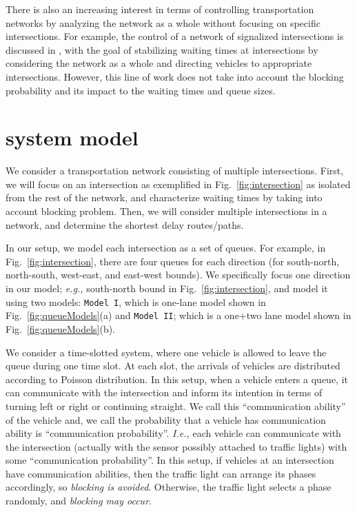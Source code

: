 \documentclass[conference]{IEEEtran}
\newcommand{\Ie}{{\em I.e., }}
\newcommand{\eg}{{\em e.g., }}
\newcommand{\modelI}{{\tt{Model I}}}
\newcommand{\modelII}{{\tt{Model II}}}
\begin{document}
There is also an increasing interest in terms of controlling transportation networks by analyzing the network as a whole without focusing on specific intersections. For example, the control of a network of signalized intersections is discussed in \cite{gregoire}, with the goal of stabilizing waiting times at intersections by considering the network as a whole and directing vehicles to appropriate intersections. However, this line of work does not take into account the blocking probability and its impact to the waiting times and queue sizes.

\vspace{-5pt}
\section{system model}\label{sec:system model}
We consider a transportation network consisting of multiple intersections. First, we will focus on an intersection as exemplified in Fig.~\ref{fig:intersection} as isolated from the rest of the network, and characterize waiting times by taking into account blocking problem. Then, we will consider multiple intersections in a network, and determine the shortest delay routes/paths.

In our setup, we model each intersection as a set of queues. For example, in Fig.~\ref{fig:intersection}, there are four queues for each direction (for south-north, north-south, west-east, and east-west bounds). We specifically focus one direction in our model; \eg south-north bound in Fig.~\ref{fig:intersection}, and model it using two models: \modelI, which is one-lane model shown in Fig.~\ref{fig:queueModels}(a) and \modelII; which is a one+two lane model shown in Fig.~\ref{fig:queueModels}(b).

We consider a time-slotted system, where one vehicle is allowed to leave the queue during one time slot. At each slot, the arrivals of vehicles are distributed according to Poisson distribution. In this setup, when a vehicle enters a queue, it can communicate with the intersection and inform its intention in terms of turning left or right or continuing straight. We call this ``communication ability'' of the vehicle and, we call the probability that a vehicle has communication ability is ``communication probability''. \Ie each vehicle can communicate with  the intersection (actually with the sensor possibly attached to traffic lights) with some ``communication probability''. In this setup, if vehicles at an intersection have communication abilities, then the traffic light can arrange its phases accordingly, so {\em blocking is avoided}. Otherwise, the traffic light selects a phase randomly, and {\em blocking may occur}.
\end{document}
